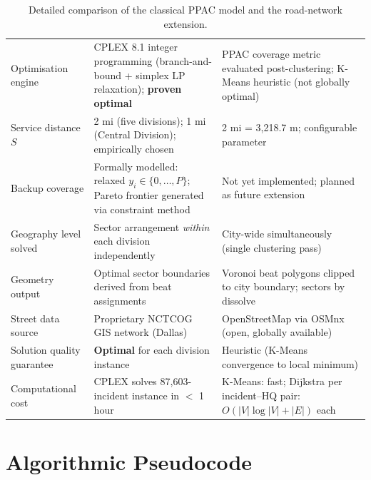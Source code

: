 \documentclass[12pt]{article}
\begin{document}
\begin{table}[h]
\begin{tabularx}{\textwidth}{@{} l X X @{}}
\addlinespace
Optimisation engine
    & CPLEX 8.1 integer programming (branch-and-bound + simplex LP relaxation);
      \textbf{proven optimal}
    & PPAC coverage metric evaluated post-clustering;
      K-Means heuristic (not globally optimal) \\

\addlinespace
Service distance $S$
    & 2 mi (five divisions); 1 mi (Central Division); empirically chosen
    & 2 mi = 3,218.7 m; configurable parameter \\

\addlinespace
Backup coverage
    & Formally modelled: relaxed $y_i \in \{0,\dots,P\}$;
      Pareto frontier generated via constraint method
    & Not yet implemented; planned as future extension \\

\addlinespace
Geography level solved
    & Sector arrangement \emph{within} each division independently
    & City-wide simultaneously (single clustering pass) \\

\addlinespace
Geometry output
    & Optimal sector boundaries derived from beat assignments
    & Voronoi beat polygons clipped to city boundary; sectors by dissolve \\

\addlinespace
Street data source
    & Proprietary NCTCOG GIS network (Dallas)
    & OpenStreetMap via OSMnx (open, globally available) \\

\addlinespace
Solution quality guarantee
    & \textbf{Optimal} for each division instance
    & Heuristic (K-Means convergence to local minimum) \\

\addlinespace
Computational cost
    & CPLEX solves 87,603-incident instance in $<$ 1 hour
    & K-Means: fast; Dijkstra per incident--HQ pair: $O(|V|\log|V| + |E|)$ each \\

\bottomrule
\end{tabularx}
\caption{Detailed comparison of the classical PPAC model and the road-network extension.}
\label{tab:comparison}
\end{table}

\section{Algorithmic Pseudocode}
\end{document}
